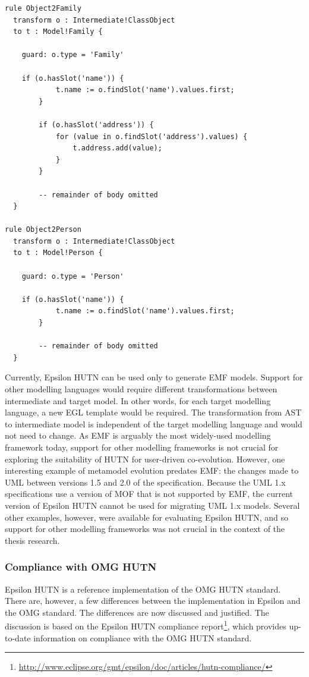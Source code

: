 \begin{lstlisting}[caption=The M2M transformation generated for the Families metamodel, label=lst:hutn_generated_transformation, language=ETL, float=tb]
rule Object2Family
  transform o : Intermediate!ClassObject
  to t : Model!Family {

    guard: o.type = 'Family'

    if (o.hasSlot('name')) {
			t.name := o.findSlot('name').values.first;
		}
		
		if (o.hasSlot('address')) {
			for (value in o.findSlot('address').values) {
				t.address.add(value);
			}
		}
		
		-- remainder of body omitted
  }

rule Object2Person
  transform o : Intermediate!ClassObject
  to t : Model!Person {

    guard: o.type = 'Person'

    if (o.hasSlot('name')) {
			t.name := o.findSlot('name').values.first;
		}
		
		-- remainder of body omitted
  }
\end{lstlisting}

Currently, Epsilon HUTN can be used only to generate EMF models. Support for other modelling languages would require different transformations between intermediate and target model. In other words, for each target modelling language, a new EGL template would be required. The transformation from AST to intermediate model is independent of the target modelling language and would not need to change. As EMF is arguably the most widely-used modelling framework today, support for other modelling frameworks is not crucial for exploring the suitability of HUTN for user-driven co-evolution. However, one interesting example of metamodel evolution predates EMF: the changes made to UML between versions 1.5 and 2.0 of the specification. Because the UML 1.x specifications use a version of MOF that is not supported by EMF, the current version of Epsilon HUTN cannot be used for migrating UML 1.x models. Several other examples, however, were available for evaluating Epsilon HUTN, and so support for other modelling frameworks was not crucial in the context of the thesis research.

\subsubsection{Compliance with OMG HUTN}
Epsilon HUTN is a reference implementation of the OMG HUTN standard. There are, however, a few differences between the implementation in Epsilon and the OMG standard. The differences are now discussed and justified. The discussion is based on the Epsilon HUTN compliance report\footnote{\url{http://www.eclipse.org/gmt/epsilon/doc/articles/hutn-compliance/}}, which provides up-to-date information on compliance with the OMG HUTN standard.

